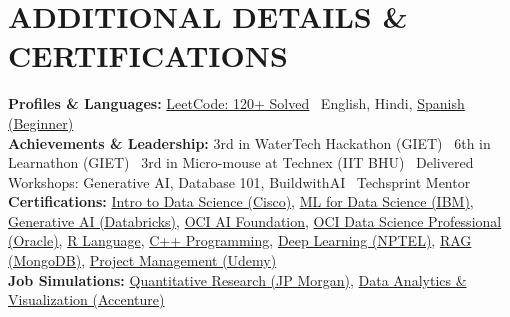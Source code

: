 \documentclass[a4paper,10pt]{article}
\begin{document}
\section*{ADDITIONAL DETAILS \& CERTIFICATIONS}
\textbf{Profiles \& Languages:} \href{https://leetcode.com/u/Chitranshu0/}{LeetCode: 120+ Solved} \textbar\ English, Hindi, \href{https://www.duolingo.com/profile/Chitranshu0}{Spanish (Beginner)}\\
\textbf{Achievements \& Leadership:} 3rd in WaterTech Hackathon (GIET) \textbar\ 6th in Learnathon (GIET) \textbar\ 3rd in Micro-mouse at Technex (IIT BHU) \textbar\ Delivered Workshops: Generative AI, Database 101, BuildwithAI \textbar\ Techsprint Mentor \\
\textbf{Certifications:} 
\href{https://www.credly.com/badges/17c90d86-9797-4798-a088-4dcf9361e75b/linked_in_profile}{Intro to Data Science (Cisco)}, 
\href{https://www.credly.com/badges/5c756b63-478c-44eb-aea7-790aa632a77d/linked_in_profile}{ML for Data Science (IBM)}, 
\href{https://credentials.databricks.com/3f760a8d-9602-4faa-a69d-d10ee529c6fe}{Generative AI (Databricks)}, 
\href{https://catalog-education.oracle.com/ords/certview/sharebadge?id=A74BAEE475B2B42837E76DEDAA9BDBA2C95F9BE379458867CF229D072955FB08}{OCI AI Foundation}, 
\href{https://catalog-education.oracle.com/pls/certview/sharebadge?id=CDED7695B5FAE61AB79E787BBC190F5B0DB7BDA920000CDAF4A18AA46F7BC96A}{OCI Data Science Professional (Oracle)}, 
\href{https://archive.nptel.ac.in/content/noc/NOC25/SEM2/Ecertificates/111/noc25-ma100/Course/NPTEL25MA100S65720006810259477.pdf}{R Language}, 
\href{https://archive.nptel.ac.in/content/noc/NOC25/SEM1/Ecertificates/106/noc25-cs58/Course/NPTEL25CS58S44610006604438362.pdf}{C++ Programming}, 
\href{https://storage.googleapis.com/2026-mar-halltickets/certificate-generation-apr26/final/regular/noc26-cs01/NOC26CS01S105540014604244504.pdf}{Deep Learning (NPTEL)}, 
\href{https://learn.mongodb.com/c/o1gCvbBOSAKMxtcYkz66ng}{RAG (MongoDB)}, 
\href{https://www.udemy.com/certificate/UC-ee5e304f-64d1-4848-8470-7edc9f8d8278/}{Project Management (Udemy)} \\
\textbf{Job Simulations:} 
\href{https://www.theforage.com/completion-certificates/Sj7temL583QAYpHXD/bWqaecPDbYAwSDqJy_Sj7temL583QAYpHXD_cpZg8yhrRH7eneAvf_1764855628544_completion_certificate.pdf}{Quantitative Research (JP Morgan)}, 
\href{https://www.theforage.com/completion-certificates/Accenture%20North%20America/hzmoNKtzvAzXsEqx8_Accenture%20North%20America_cpZg8yhrRH7eneAvf_1729277279654_completion_certificate.pdf}{Data Analytics \& Visualization (Accenture)}
\end{document}
